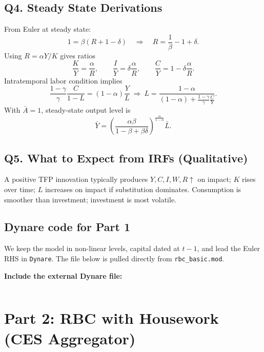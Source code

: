 \documentclass[a4paper,12pt]{article} %
\theoremstyle{nonitalic}
\begin{document}
\subsection{Q4. Steady State Derivations}
From Euler at steady state:
\begin{equation}
1=\beta(R+1-\delta)\quad \Rightarrow\quad R=\frac{1}{\beta}-1+\delta.
\end{equation}
Using $R=\alpha Y/K$ gives ratios
\begin{equation}
\frac{K}{Y}=\frac{\alpha}{R},\qquad \frac{I}{Y}=\delta \frac{\alpha}{R},\qquad \frac{C}{Y}=1-\delta\frac{\alpha}{R}.
\end{equation}
Intratemporal labor condition implies
\begin{equation}
\frac{1-\gamma}{\gamma}\frac{C}{1-L}=(1-\alpha)\frac{Y}{L}
\ \Rightarrow\
L=\frac{1-\alpha}{(1-\alpha)+\frac{1-\gamma}{\gamma}\frac{C}{Y}}.
\end{equation}
With $\bar A=1$, steady-state output level is
\begin{equation}
\bar Y= \left(\frac{\alpha\beta}{1-\beta+\beta\delta}\right)^{\frac{\alpha}{1-\alpha}} \bar L.
\end{equation}

\subsection{Q5. What to Expect from IRFs (Qualitative)}
A positive TFP innovation typically produces $Y,C,I,W,R\uparrow$ on impact; $K$ rises over time; $L$ increases on impact if substitution dominates.
Consumption is smoother than investment; investment is most volatile.

\subsection{Dynare code for Part 1}
We keep the model in non-linear levels, capital dated at $t\!-\!1$, and lead the Euler RHS in \texttt{Dynare}.
The file below is pulled directly from \texttt{rbc\_basic.mod}.
\medskip

\noindent\textbf{Include the external Dynare file:}
\begin{lstlisting}[language=Dynare,caption={\texttt{rbc\_basic.mod}},label={lst:rbc_basic}]

\end{lstlisting}

\section{Part 2: RBC with Housework (CES Aggregator)}
\end{document}
